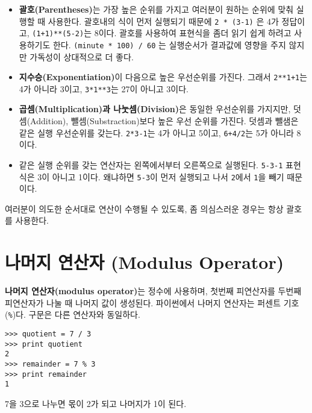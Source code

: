 \begin{itemize}

\item {\bf 괄호(Parentheses)}는 가장 높은 순위를 가지고 여러분이 원하는 순위에 맞춰 실행할 때 사용한다. 
괄호내의 식이 먼저 실행되기 때문에 {\tt 2 * (3-1)} 은 4가 정답이고, {\tt (1+1)**(5-2)}는 8이다. 
괄호를 사용하여 표현식을 좀더 읽기 쉽게 하려고 사용하기도 한다. 
{\tt (minute * 100) / 60} 는 실행순서가 결과값에 영향을 주지 않지만 가독성이 상대적으로 더 좋다.

\item {\bf 지수승(Exponentiation)}이 다음으로 높은 우선순위를 가진다. 
그래서 {\tt 2**1+1}는 4가 아니라 3이고, {\tt 3*1**3}는 27이 아니고 3이다. 

\item {\bf 곱셈(Multiplication)과 나눗셈(Division)}은 동일한 우선순위를 가지지만, 덧셈(Addition), 뺄셈(Substraction)보다 높은 우선 순위를 가진다. 덧셈과 뺄샘은 같은 실행 우선순위를 갖는다. {\tt 2*3-1}는 4가 아니고 5이고, {\tt 6+4/2}는 5가 아니라 8이다.

\item 같은 실행 순위를 갖는 연산자는 왼쪽에서부터 오른쪽으로 실행된다. 
{\tt 5-3-1} 표현식은 3이 아니고 1이다. 왜냐하면 {\tt 5-3}이 먼저 실행되고 나서 {\tt 2}에서 {\tt 1}을 빼기 때문이다.

\end{itemize}

여러분이 의도한 순서대로 연산이 수행될 수 있도록, 좀 의심스러운 경우는 항상 괄호를 사용한다.

\section{나머지 연산자 (Modulus Operator)}


{\bf 나머지 연산자(modulus operator)}는 정수에 사용하며, 첫번째 피연산자를 두번째 피연산자가 나눌 때 나머지 값이 생성된다. 
파이썬에서 나머지 연산자는 퍼센트 기호(\verb"%")다. 구문은 다른 연산자와 동일하다.

\beforeverb
\begin{verbatim}
>>> quotient = 7 / 3
>>> print quotient
2
>>> remainder = 7 % 3
>>> print remainder
1
\end{verbatim}
\afterverb
%

7을 3으로 나누면 몫이 2가 되고 나머지가 1이 된다.

